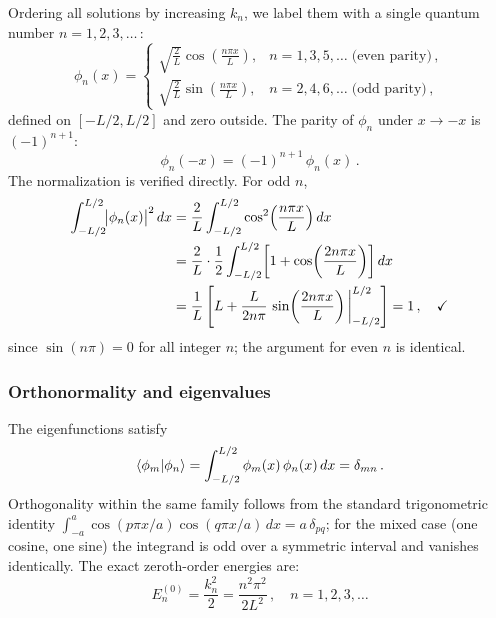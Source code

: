 Ordering all solutions by increasing $k_n$, we label them with a single quantum
number $n = 1, 2, 3, \ldots$\,:
\begin{equation}\label{eq:PIB_basis}
  \boxed{\phi_n(x) =
  \begin{cases}
    \displaystyle\sqrt{\frac{2}{L}}\cos\!\left(\frac{n\pi x}{L}\right),
    & n = 1, 3, 5, \ldots\;\text{(even parity)}\,,\\[10pt]
    \displaystyle\sqrt{\frac{2}{L}}\sin\!\left(\frac{n\pi x}{L}\right),
    & n = 2, 4, 6, \ldots\;\text{(odd parity)}\,,
  \end{cases}}
\end{equation}
defined on $[-L/2, L/2]$ and zero outside.  The parity of $\phi_n$ under $x \to -x$
is $(-1)^{n+1}$:
\begin{equation}\label{eq:PIB_parity}
  \phi_n(-x) = (-1)^{n+1}\,\phi_n(x)\,.
\end{equation}
The normalization is verified directly.  For odd $n$,
\begin{align}
  \int_{-L/2}^{L/2}\!\bigl|\phi_n(x)\bigr|^2\,dx
  &= \frac{2}{L}\int_{-L/2}^{L/2}\cos^2\!\left(\frac{n\pi x}{L}\right)dx\notag\\
  &= \frac{2}{L}\cdot\frac{1}{2}\int_{-L/2}^{L/2}\!\left[1 + \cos\!\left(\frac{2n\pi x}{L}\right)\right]dx\notag\\
  &= \frac{1}{L}\left[L + \frac{L}{2n\pi}\,\sin\!\left(\frac{2n\pi x}{L}\right)\bigg|_{-L/2}^{L/2}\right]
  = 1\,,\quad\checkmark
\end{align}
since $\sin(n\pi) = 0$ for all integer $n$; the argument for even $n$ is identical.

\subsubsection{Orthonormality and eigenvalues}

The eigenfunctions satisfy
\begin{equation}\label{eq:PIB_ortho}
  \braket{\phi_m}{\phi_n} = \int_{-L/2}^{L/2}\phi_m(x)\,\phi_n(x)\,dx = \delta_{mn}\,.
\end{equation}
Orthogonality within the same family follows from the standard trigonometric
identity $\int_{-a}^{a}\cos(p\pi x/a)\cos(q\pi x/a)\,dx = a\,\delta_{pq}$; for
the mixed case (one cosine, one sine) the integrand is odd over a symmetric interval
and vanishes identically.  The exact zeroth-order energies are:
\begin{equation}\label{eq:PIB_En}
  \boxed{E_n^{(0)} = \frac{k_n^2}{2} = \frac{n^2\pi^2}{2L^2}\,,\quad n = 1, 2, 3, \ldots}
\end{equation}


